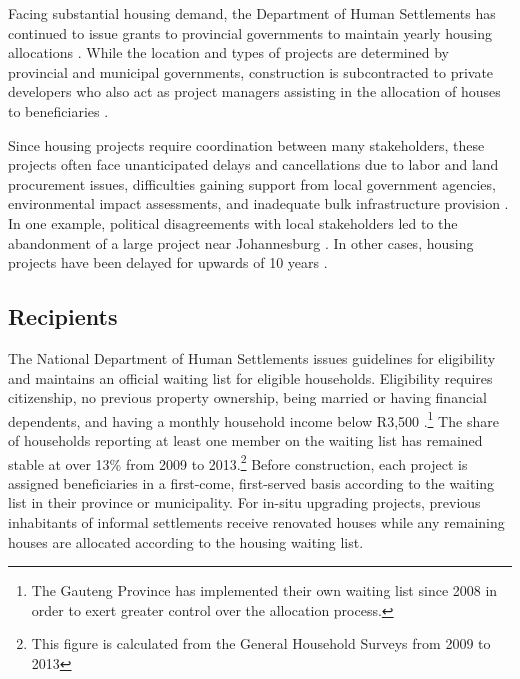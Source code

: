 \documentclass[12pt]{article}
\begin{document}
Facing substantial housing demand, the Department of Human Settlements has continued to issue grants to provincial governments to maintain yearly housing allocations \citep{dhsreports}.  While the location and types of projects are determined by provincial and municipal governments, construction is subcontracted to private developers who also act as project managers assisting in the allocation of houses to beneficiaries \citep{seriq}.

Since housing projects require coordination between many stakeholders, these pro\-jects often face unanticipated delays and cancellations due to labor and land procurement issues, difficulties gaining support from local government agencies, environmental impact assessments, and inadequate bulk infrastructure provision \citep{dhsreports}.  In one example, political disagreements with local stakeholders led to the abandonment of a large project near Johannesburg \citep{protest}.  In other cases, housing projects have been delayed for upwards of 10 years \citep{dagpl}. 


\subsection{Recipients}

The National Department of Human Settlements issues guidelines for eligibility and maintains an official waiting list for eligible households.  Eligibility requires citizenship, no previous property ownership, being married or having financial dependents, and having a monthly household income below R3,500 \citep{seriq}.\footnote{The Gauteng Province has implemented their own waiting list since 2008 in order to exert greater control over the allocation process.}  The share of households reporting at least one member on the waiting list has remained stable at over 13\% from 2009 to 2013.\footnote{\label{GHSnote}This figure is calculated from the General Household Surveys from 2009 to 2013}  Before construction, each project is assigned beneficiaries in a first-come, first-served basis according to the waiting list in their province or municipality.  For in-situ upgrading projects, previous inhabitants of informal settlements receive renovated houses while any remaining houses are allocated according to the housing waiting list.
\end{document}
